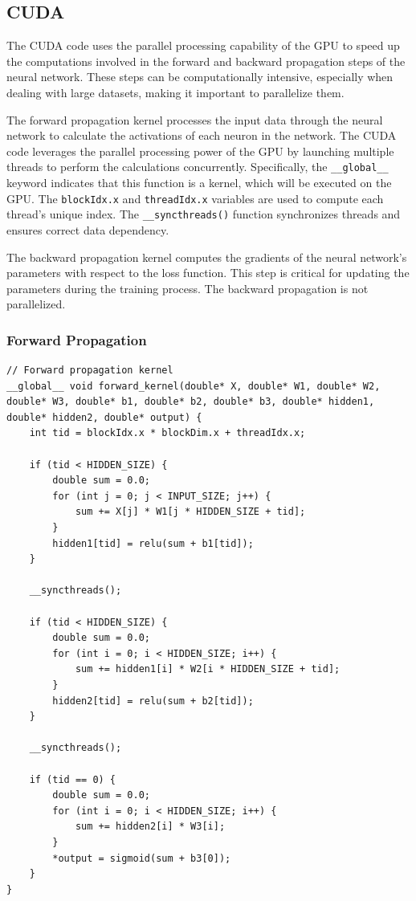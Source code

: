 \documentclass[11pt]{article}
\begin{document}
\clearpage

\subsection{CUDA}

The CUDA code uses the parallel processing capability of the GPU to speed up the computations involved in the forward and backward propagation steps of the neural network. These steps can be computationally intensive, especially when dealing with large datasets, making it important to parallelize them.

\bigskip

The forward propagation kernel processes the input data through the neural network to calculate the activations of each neuron in the network. The CUDA code leverages the parallel processing power of the GPU by launching multiple threads to perform the calculations concurrently. Specifically, the \texttt{\_\_global\_\_} keyword indicates that this function is a kernel, which will be executed on the GPU. The \texttt{blockIdx.x} and \texttt{threadIdx.x} variables are used to compute each thread's unique index. The \texttt{\_\_syncthreads()} function synchronizes threads and ensures correct data dependency.

\bigskip

The backward propagation kernel computes the gradients of the neural network's parameters with respect to the loss function. This step is critical for updating the parameters during the training process. The backward propagation is not parallelized.

\subsubsection{Forward Propagation}
\begin{lstlisting}[style=CStyle, caption={Forward path CUDA of main.c}, label = {lst:ForwardpathCodeCUDA}]
// Forward propagation kernel
__global__ void forward_kernel(double* X, double* W1, double* W2, double* W3, double* b1, double* b2, double* b3, double* hidden1, double* hidden2, double* output) {
    int tid = blockIdx.x * blockDim.x + threadIdx.x;

    if (tid < HIDDEN_SIZE) {
        double sum = 0.0;
        for (int j = 0; j < INPUT_SIZE; j++) {
            sum += X[j] * W1[j * HIDDEN_SIZE + tid];
        }
        hidden1[tid] = relu(sum + b1[tid]);
    }

    __syncthreads();

    if (tid < HIDDEN_SIZE) {
        double sum = 0.0;
        for (int i = 0; i < HIDDEN_SIZE; i++) {
            sum += hidden1[i] * W2[i * HIDDEN_SIZE + tid];
        }
        hidden2[tid] = relu(sum + b2[tid]);
    }

    __syncthreads();

    if (tid == 0) {
        double sum = 0.0;
        for (int i = 0; i < HIDDEN_SIZE; i++) {
            sum += hidden2[i] * W3[i];
        }
        *output = sigmoid(sum + b3[0]);
    }
}
\end{lstlisting}
\end{document}
